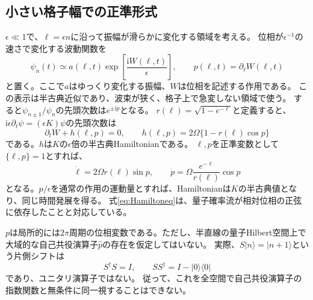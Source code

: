 \documentclass[a4paper,11pt]{ltjsarticle}
\numberwithin{equation}{section}
\newcommand{\ket}[1]{\lvert #1\rangle}
\newcommand{\bra}[1]{\langle #1\rvert}
\newcommand{\ii}{\mathrm i}
\begin{document}
\subsection{小さい格子幅での正準形式}
$\epsilon\ll1$で、$\ell=\epsilon n$に沿って振幅が滑らかに変化する領域を考える。
位相が$\epsilon^{-1}$の速さで変化する波動関数を
\begin{equation}
 \psi_n(t)\simeq a(\ell,t)\exp\!\left[\frac{\ii W(\ell,t)}{\epsilon}\right],
 \qquad p(\ell,t)=\partial_\ell W(\ell,t)
 \label{eq:WKB}
\end{equation}
と置く。ここで$a$はゆっくり変化する振幅、$W$は位相を記述する作用である。
この表示は半古典近似であり、波束が狭く、格子上で急変しない領域で使う。
すると$\psi_{n\pm1}/\psi_n$の先頭次数は$e^{\pm\ii p}$となる。
$r(\ell)=\sqrt{1-e^{-\ell}}$と定義すると、
$\ii\epsilon\partial_t\psi=(\epsilon K)\psi$の先頭次数は
\begin{equation}
 \partial_tW+h(\ell,p)=0,\qquad
 h(\ell,p)=2\Omega\{1-r(\ell)\cos p\}
 \label{eq:classicalH}
\end{equation}
である。$h$は$K$の$\epsilon$倍の半古典Hamiltonianである。
$\ell,p$を正準変数として$\{\ell,p\}=1$とすれば、
\begin{equation}
 \dot\ell=2\Omega r(\ell)\sin p,
 \qquad \dot p=\Omega\frac{e^{-\ell}}{r(\ell)}\cos p
 \label{eq:Hamiltoneq}
\end{equation}
となる。$p/\epsilon$を通常の作用の運動量とすれば、Hamiltonianは$K$の半古典値となり、同じ時間発展を得る。
式\eqref{eq:Hamiltoneq}は、量子確率流が相対位相の正弦に依存したことと対応している。

$p$は局所的には$2\pi$周期の位相変数である。ただし、半直線の量子Hilbert空間上で
大域的な自己共役演算子$\hat p$の存在を仮定してはいない。
実際、$S\ket n=\ket{n+1}$という片側シフトは
\begin{equation}
 S^\dagger S=I,\qquad SS^\dagger=I-\ket0\bra0
 \label{eq:unilateral}
\end{equation}
であり、ユニタリ演算子ではない。
従って、これを全空間で自己共役演算子の指数関数と無条件に同一視することはできない。
\end{document}
